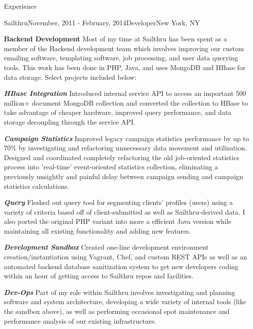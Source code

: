 \documentclass{resume} %
\begin{document}
\begin{rSection}{Experience}
    \begin{rSubsection}{Sailthru}{November, 2011 - February, 2014}{Developer}{New York, NY}
    \item \textbf{Backend Development} Most of my time at Sailthru has been spent as a member of the Backend development team which involves improving our custom emailing software, templating software, job processing, and user data querying tools.  This work has been done in PHP, Java, and uses MongoDB and HBase for data storage.  Select projects included below:
    \item \textbf{\textit{HBase Integration}} Introduced internal service API to access an important 500 million+ document MongoDB collection and converted the collection to HBase to take advantage of cheaper hardware, improved query performance, and data storage decoupling through the service API.
    \item \textbf{\textit{Campaign Statistics}} Improved legacy campaign statistics performance by up to 70\% by investigating and refactoring unnecessary data movement and utilization. Designed and coordinated completely refactoring the old job-oriented statistics process into 'real-time' event-oriented statistics collection, eliminating a previously unsightly and painful delay between campaign sending and campaign statistics calculations.
    \item \textbf{\textit{Query}} Fleshed out query tool for segmenting clients' profiles (users) using a variety of criteria based off of client-submitted as well as Sailthru-derived data. I also ported the original PHP variant into more a efficient Java version while maintaining all existing functionality and adding new features.
    \item \textbf{\textit{Development Sandbox}} Created one-line development environment creation/instantiation using Vagrant, Chef, and custom REST APIs as well as an automated backend database sanitization system to get new developers coding within an hour of getting access to Sailthru repos and facilities.
    \item \textbf{\textit{Dev-Ops}} Part of my role within Sailthru involves investigating and planning software and system architecture, developing a wide variety of internal tools (like the sandbox above), as well as performing occasional spot maintenance and performance analysis of our existing infrastructure.
    \end{rSubsection}



\end{rSection}
\end{document}
